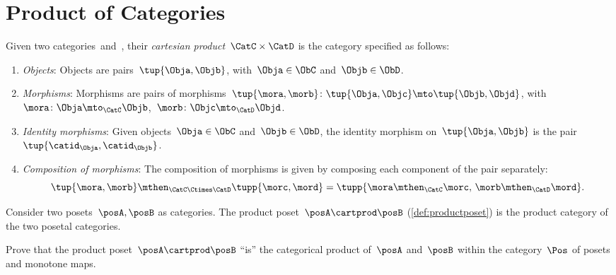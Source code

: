
\section{Product of Categories}

\begin{ctdefinition}
    \label{def:cartesian-product-category}
    Given two categories~\CatC and~\CatD, their \emph{cartesian product}~$\CatC \times \CatD$ is the category specified as follows:
    \begin{enumerate}
        \item \emph{Objects}: Objects are pairs~$\tup{\Obja,\Objb}$, with~$\Obja\in \ObC$ and~$\Objb\in \ObD$.
        \item \emph{Morphisms}: Morphisms are pairs of morphisms~$\tup{\mora,\morb} \colon \tup{\Obja,\Objc}\mto \tup{\Objb,\Objd}$, with~$\mora\colon \Obja \mto_\CatC \Objb$,~$\morb\colon \Objc\mto_\CatD \Objd$.
        \item \emph{Identity morphisms}: Given objects~$\Obja\in \ObC$ and~$\Objb\in \ObD$, the identity morphism on~$\tup{\Obja,\Objb}$ is the pair $\tup{\catid_\Obja ,\catid_\Objb}$.
        \item \emph{Composition of morphisms}: The composition of morphisms is given by composing each component of the pair separately:
              \begin{equation}
                  \tup{\mora,\morb}\mthen_{\CatC\Ctimes\CatD} \tupp{\morc,\mord}=\tupp{\mora\mthen_{\CatC}\morc,\, \morb \mthen_{\CatD} \mord}.
              \end{equation}
    \end{enumerate}
\end{ctdefinition}

\begin{example}
    Consider two posets~$\posA,\posB$ as categories.
    The product poset~$\posA\cartprod \posB$ (\cref{def:productposet}) is the product category of the two posetal categories.
\end{example}

\begin{gradedexercise}
    Prove that the product poset~$\posA \cartprod \posB$ ``is'' the categorical product of~$\posA$ and~$\posB$ within the category~$\Pos$ of posets and monotone maps.
\end{gradedexercise}

